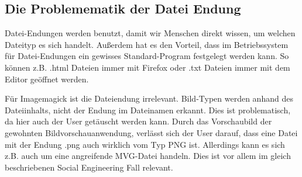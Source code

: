 \subsection{Die Problemematik der Datei Endung}\label{subsec:die-problemematik-der-datei-endung}
Datei-Endungen werden benutzt, damit wir Menschen direkt wissen, um welchen Dateityp es sich handelt.
Außerdem hat es den Vorteil, dass im Betriebssystem für Datei-Endungen ein gewisses Standard-Program festgelegt werden kann.
So können z.B. .html Dateien immer mit Firefox oder .txt Dateien immer mit dem Editor geöffnet werden.

Für Imagemagick ist die Dateiendung irrelevant.
Bild-Typen werden anhand des Dateiinhalts, nicht der Endung im Dateinamen erkannt.
Dies ist problematisch, da hier auch der User getäuscht werden kann.
Durch das Vorschaubild der gewohnten Bildvorschauanwendung, verlässt sich der User darauf, dass eine Datei mit der Endung .png auch wirklich vom Typ PNG ist.
Allerdings kann es sich z.B. auch um eine angreifende MVG-Datei handeln.
Dies ist vor allem im gleich beschriebenen Social Engineering Fall relevant.